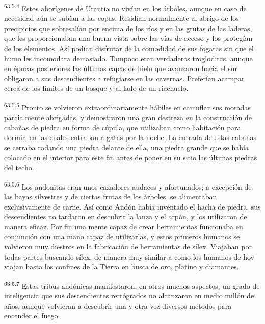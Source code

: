 \par
\textsuperscript{63:5.4} Estos aborígenes de Urantia no vivían en los árboles, aunque en caso de necesidad aún se subían a las copas. Residían normalmente al abrigo de los precipicios que sobresalían por encima de los ríos y en las grutas de las laderas, que les proporcionaban una buena vista sobre las vías de acceso y los protegían de los elementos. Así podían disfrutar de la comodidad de sus fogatas sin que el humo les incomodara demasiado. Tampoco eran verdaderos trogloditas, aunque en épocas posteriores las últimas capas de hielo que avanzaron hacia el sur obligaron a sus descendientes a refugiarse en las cavernas. Preferían acampar cerca de los límites de un bosque y al lado de un riachuelo.

\par
\textsuperscript{63:5.5} Pronto se volvieron extraordinariamente hábiles en camuflar sus moradas parcialmente abrigadas, y demostraron una gran destreza en la construcción de cabañas de piedra en forma de cúpula, que utilizaban como habitación para dormir, en las cuales entraban a gatas por la noche. La entrada de estas cabañas se cerraba rodando una piedra delante de ella, una piedra grande que se había colocado en el interior para este fin antes de poner en su sitio las últimas piedras del techo.

\par
\textsuperscript{63:5.6} Los andonitas eran unos cazadores audaces y afortunados; a excepción de las bayas silvestres y de ciertas frutas de los árboles, se alimentaban exclusivamente de carne. Así como Andón había inventado el hacha de piedra, sus descendientes no tardaron en descubrir la lanza y el arpón, y los utilizaron de manera eficaz. Por fin una mente capaz de crear herramientas funcionaba en conjunción con una mano capaz de utilizarlas, y estos primeros humanos se volvieron muy diestros en la fabricación de herramientas de sílex. Viajaban por todas partes buscando sílex, de manera muy similar a como los humanos de hoy viajan hasta los confines de la Tierra en busca de oro, platino y diamantes.

\par
\textsuperscript{63:5.7} Estas tribus andónicas manifestaron, en otros muchos aspectos, un grado de inteligencia que sus descendientes retrógrados no alcanzaron en medio millón de años, aunque volvieran a descubrir una y otra vez diversos métodos para encender el fuego.

